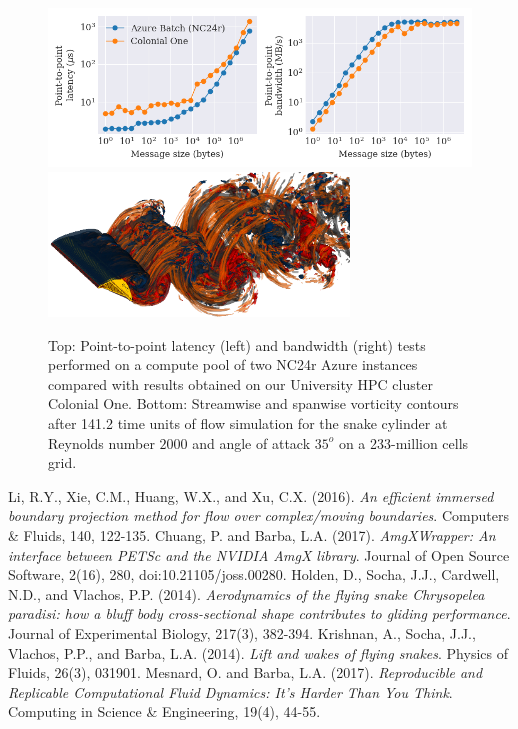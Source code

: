 \documentclass{parcfd2018}
\begin{document}
\begin{figure}[!h]
\centering
\includegraphics[width=12cm]{figures/latencyBandwidthColonialOneAzure.png}
\includegraphics[width=8cm]{figures/wz_wx_wake3d_2k35_meshB_0026.png}
\caption{Top: Point-to-point latency (left) and bandwidth (right) tests performed on a compute pool of two NC24r Azure instances compared with results obtained on our University HPC cluster Colonial One.
Bottom: Streamwise and spanwise vorticity contours after 141.2 time units of flow simulation for the snake cylinder at Reynolds number $2000$ and angle of attack $35^o$ on a 233-million cells grid.}
\label{latency_bandwidth_wz_wx}
\end{figure}

\footnotesize
\begin{thebibliography}{99}
  Li, R.Y., Xie, C.M., Huang, W.X., and Xu, C.X. (2016). \textit{An efficient immersed boundary projection method for flow over complex/moving boundaries}. Computers \& Fluids, 140, 122-135.
  Chuang, P. and Barba, L.A. (2017). \textit{AmgXWrapper: An interface between PETSc and the NVIDIA AmgX library}. Journal of Open Source Software, 2(16), 280, doi:10.21105/joss.00280.
  Holden, D., Socha, J.J., Cardwell, N.D., and Vlachos, P.P. (2014). \textit{Aerodynamics of the flying snake Chrysopelea paradisi: how a bluff body cross-sectional shape contributes to gliding performance}. Journal of Experimental Biology, 217(3), 382-394.
 Krishnan, A., Socha, J.J., Vlachos, P.P., and Barba, L.A. (2014). \textit{Lift and wakes of flying snakes}. Physics of Fluids, 26(3), 031901.
  Mesnard, O. and Barba, L.A. (2017). \textit{Reproducible and Replicable Computational Fluid Dynamics: It's Harder Than You Think}. Computing in Science \& Engineering, 19(4), 44-55.
\end{thebibliography}
\end{document}
